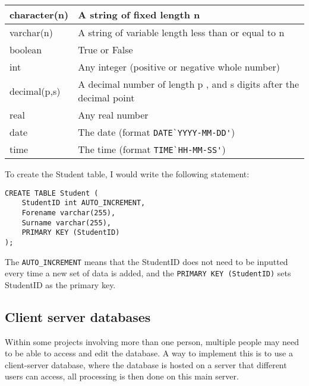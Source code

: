 \begin{table}[H]
	\begin{tabular}{| l | l |}\hline
		character(n) & A string of fixed length n\\\hline
		varchar(n) & A string of variable length less than or equal to n\\\hline
		boolean & True or False\\\hline
		int & Any integer (positive or negative whole number)\\\hline
		decimal(p,s) & A decimal number of  length p , and s digits after the decimal point\\\hline
		real & Any real number\\\hline
		date & The date (format \verb|DATE`YYYY-MM-DD'|)\\\hline
		time & The time (format \verb|TIME`HH-MM-SS'|)\\\hline
	\end{tabular}
\end{table}

To create the Student table, I would write the following statement:

\begin{verbatim}
CREATE TABLE Student (
	StudentID int AUTO_INCREMENT,
	Forename varchar(255),
	Surname varchar(255),
	PRIMARY KEY (StudentID)
);
\end{verbatim}

The \verb|AUTO_INCREMENT| means that the StudentID does not need to be inputted every time a new set of data is added, and the \verb|PRIMARY KEY (StudentID)| sets StudentID as the primary key.

\subsection{Client server databases}

Within some projects involving more than one person, multiple people may need to be able to access and edit the database. A way to implement this is to use a client-server database, where the database is hosted on a server that different users can access, all processing is then done on this main server.

